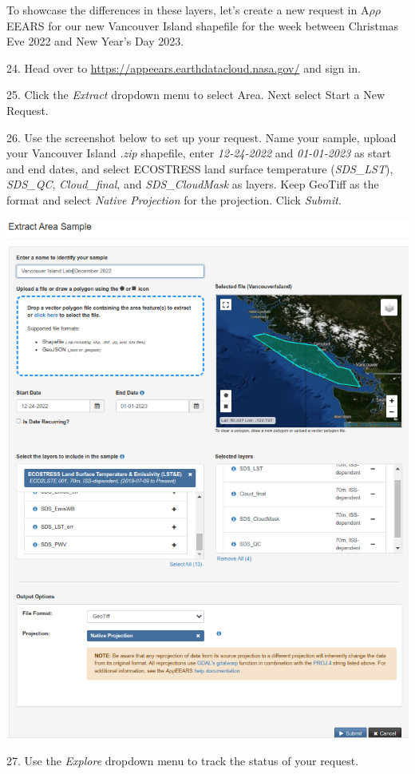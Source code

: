\documentclass[oneside,a4paper,11pt,explicit]{book}
\begin{document}
	\vspace*{.75em}
	
	To showcase the differences in these layers, let's create a new request in A$\rho\rho$EEARS for our new Vancouver Island shapefile for the week between Christmas Eve 2022 and New Year's Day 2023.
	
	24. Head over to \href{https://appeears.earthdatacloud.nasa.gov/}{https://appeears.earthdatacloud.nasa.gov/} and sign in.
	
	25. Click the \textit{Extract} dropdown menu to select Area. Next select Start a New Request.
	
	26. Use the screenshot below to set up your request. Name your sample, upload your Vancouver Island \textit{.zip} shapefile, enter \textit{12-24-2022} and \textit{01-01-2023} as start and end dates, and select ECOSTRESS land surface temperature (\textit{SDS\_LST}), \textit{SDS\_QC}, \textit{Cloud\_final}, and \textit{SDS\_CloudMask} as layers. Keep GeoTiff as the format and select \textit{Native Projection} for the projection. Click \textit{Submit}.
	
	\centerline{\includegraphics[width=.75\textwidth]{ExtractVancouver.png}}
	
	27. Use the \textit{Explore} dropdown menu to track the status of your request. 
	
	\vspace{.25em}
	
\end{document}
